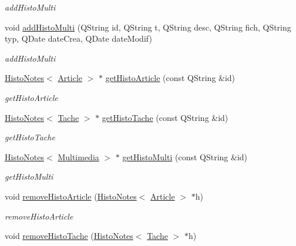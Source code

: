 \begin{DoxyCompactItemize}
\begin{DoxyCompactList}\small\item\em add\+Histo\+Multi \end{DoxyCompactList}\item 
void \hyperlink{class_archive_aebdfbce05dfe3dabfba08d4bbdadc060}{add\+Histo\+Multi} (Q\+String id, Q\+String t, Q\+String desc, Q\+String fich, Q\+String typ, Q\+Date date\+Crea, Q\+Date date\+Modif)
\begin{DoxyCompactList}\small\item\em add\+Histo\+Multi \end{DoxyCompactList}\item 
\hyperlink{class_histo_notes}{Histo\+Notes}$<$ \hyperlink{class_article}{Article} $>$ $\ast$ \hyperlink{class_archive_a31d7007db91a32e626cd53e313db8f43}{get\+Histo\+Article} (const Q\+String \&id)
\begin{DoxyCompactList}\small\item\em get\+Histo\+Article \end{DoxyCompactList}\item 
\hyperlink{class_histo_notes}{Histo\+Notes}$<$ \hyperlink{class_tache}{Tache} $>$ $\ast$ \hyperlink{class_archive_ad0d8d58a11618fce4c15cc03fa92c5da}{get\+Histo\+Tache} (const Q\+String \&id)
\begin{DoxyCompactList}\small\item\em get\+Histo\+Tache \end{DoxyCompactList}\item 
\hyperlink{class_histo_notes}{Histo\+Notes}$<$ \hyperlink{class_multimedia}{Multimedia} $>$ $\ast$ \hyperlink{class_archive_a8e58f7a12ed7dab25edc5e09448448cb}{get\+Histo\+Multi} (const Q\+String \&id)
\begin{DoxyCompactList}\small\item\em get\+Histo\+Multi \end{DoxyCompactList}\item 
void \hyperlink{class_archive_af488bb1824f5845cbb61fd6feb0eec8d}{remove\+Histo\+Article} (\hyperlink{class_histo_notes}{Histo\+Notes}$<$ \hyperlink{class_article}{Article} $>$ $\ast$h)
\begin{DoxyCompactList}\small\item\em remove\+Histo\+Article \end{DoxyCompactList}\item 
void \hyperlink{class_archive_ae2bfd7920d6fe781a63c81467df419e6}{remove\+Histo\+Tache} (\hyperlink{class_histo_notes}{Histo\+Notes}$<$ \hyperlink{class_tache}{Tache} $>$ $\ast$h)

\end{DoxyCompactItemize}
